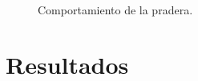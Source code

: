 \documentclass[12pt, twocolumn]{article}
\begin{document}
\begin{figure}[htbp]
\caption{Comportamiento de la pradera.} 
\label{pasto}
\end{figure}

\section{Resultados}
\label{sec:resul}
\end{document}
